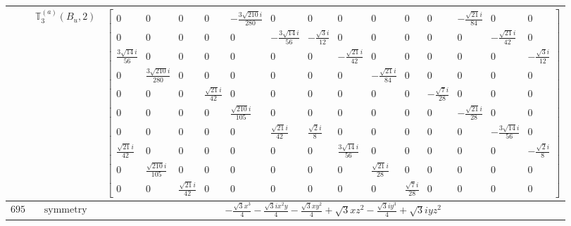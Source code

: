 \documentclass[fleqn,8pt,landscape]{jsarticle}
\begin{document}
\begin{longtable}{ccc}
$  $ & $ \mathbb{T}_{3}^{(a)}(B_{u},2) $ & $ \begin{bmatrix} 0 & 0 & 0 & 0 & - \frac{3 \sqrt{210} i}{280} & 0 & 0 & 0 & 0 & 0 & 0 & - \frac{\sqrt{21} i}{84} & 0 & 0 \\ 0 & 0 & 0 & 0 & 0 & - \frac{3 \sqrt{14} i}{56} & - \frac{\sqrt{3} i}{12} & 0 & 0 & 0 & 0 & 0 & - \frac{\sqrt{21} i}{42} & 0 \\ \frac{3 \sqrt{14} i}{56} & 0 & 0 & 0 & 0 & 0 & 0 & - \frac{\sqrt{21} i}{42} & 0 & 0 & 0 & 0 & 0 & - \frac{\sqrt{3} i}{12} \\ 0 & \frac{3 \sqrt{210} i}{280} & 0 & 0 & 0 & 0 & 0 & 0 & - \frac{\sqrt{21} i}{84} & 0 & 0 & 0 & 0 & 0 \\ 0 & 0 & 0 & \frac{\sqrt{21} i}{42} & 0 & 0 & 0 & 0 & 0 & 0 & - \frac{\sqrt{7} i}{28} & 0 & 0 & 0 \\ 0 & 0 & 0 & 0 & \frac{\sqrt{210} i}{105} & 0 & 0 & 0 & 0 & 0 & 0 & - \frac{\sqrt{21} i}{28} & 0 & 0 \\ 0 & 0 & 0 & 0 & 0 & \frac{\sqrt{21} i}{42} & \frac{\sqrt{2} i}{8} & 0 & 0 & 0 & 0 & 0 & - \frac{3 \sqrt{14} i}{56} & 0 \\ \frac{\sqrt{21} i}{42} & 0 & 0 & 0 & 0 & 0 & 0 & \frac{3 \sqrt{14} i}{56} & 0 & 0 & 0 & 0 & 0 & - \frac{\sqrt{2} i}{8} \\ 0 & \frac{\sqrt{210} i}{105} & 0 & 0 & 0 & 0 & 0 & 0 & \frac{\sqrt{21} i}{28} & 0 & 0 & 0 & 0 & 0 \\ 0 & 0 & \frac{\sqrt{21} i}{42} & 0 & 0 & 0 & 0 & 0 & 0 & \frac{\sqrt{7} i}{28} & 0 & 0 & 0 & 0 \end{bmatrix} $ \\ \hline
$ 695 $ & $ \text{symmetry} $ & $ - \frac{\sqrt{3} x^{3}}{4} - \frac{\sqrt{3} i x^{2} y}{4} - \frac{\sqrt{3} x y^{2}}{4} + \sqrt{3} x z^{2} - \frac{\sqrt{3} i y^{3}}{4} + \sqrt{3} i y z^{2} $ \\

\end{longtable}
\end{document}

